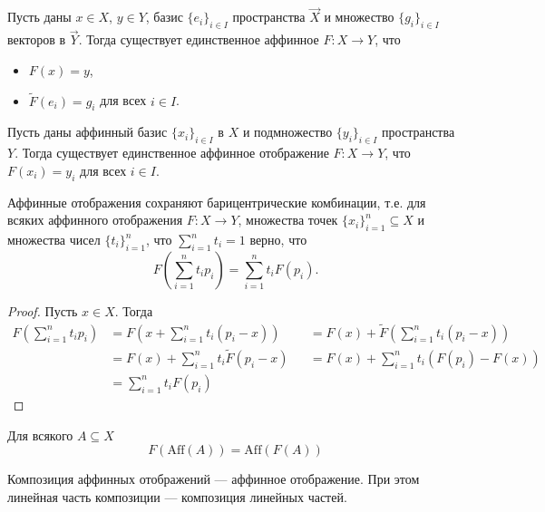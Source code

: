 \documentclass[12pt,a4paper]{article}
\newcommand{\Aff}{\ensuremath{\mathrm{Aff}}\xspace}
\begin{document}
    \begin{corollary}
        Пусть даны $x \in X$, $y \in Y$, базис $\{e_i\}_{i \in I}$ пространства $\overrightarrow{X}$ и множество $\{g_i\}_{i \in I}$ векторов в $\overrightarrow{Y}$. Тогда существует единственное аффинное $F: X \to Y$, что
        \begin{itemize}
            \item $F(x) = y$,
            \item $\widetilde{F}(e_i) = g_i$ для всех $i \in I$.
        \end{itemize}
    \end{corollary}

    \begin{corollary}
        Пусть даны аффинный базис $\{x_i\}_{i \in I}$ в $X$ и подмножество $\{y_i\}_{i \in I}$ пространства $Y$. Тогда существует единственное аффинное отображение $F: X \to Y$, что $F(x_i) = y_i$ для всех $i \in I$.
    \end{corollary}

    \begin{lemma}
        Аффинные отображения сохраняют барицентрические комбинации, т.е. для всяких аффинного отображения $F: X \to Y$, множества точек $\{x_i\}_{i=1}^n \subseteq X$ и множества чисел $\{t_i\}_{i=1}^n$, что $\sum_{i=1}^n t_i = 1$ верно, что
        \[F\left(\sum_{i=1}^n t_i p_i\right) = \sum_{i=1}^n t_i F(p_i).\]
    \end{lemma}

    \begin{proof}
        Пусть $x \in X$. Тогда
        \begin{align*}
            F\left(\sum_{i=1}^n t_i p_i\right)
            &= F\left(x + \sum_{i=1}^n t_i (p_i - x)\right)&
            &= F(x) + \widetilde{F}\left(\sum_{i=1}^n t_i (p_i - x)\right)\\
            &= F(x) + \sum_{i=1}^n t_i \widetilde{F}(p_i - x)&
            &= F(x) + \sum_{i=1}^n t_i (F(p_i) - F(x))\\
            &= \sum_{i=1}^n t_i F(p_i)&
        \end{align*}
    \end{proof}

    \begin{corollary}
        Для всякого $A \subseteq X$
        \[F(\Aff(A)) = \Aff(F(A))\]
    \end{corollary}

    \begin{lemma}
        Композиция аффинных отображений --- аффинное отображение. При этом линейная часть композиции --- композиция линейных частей.
    \end{lemma}
\end{document}
